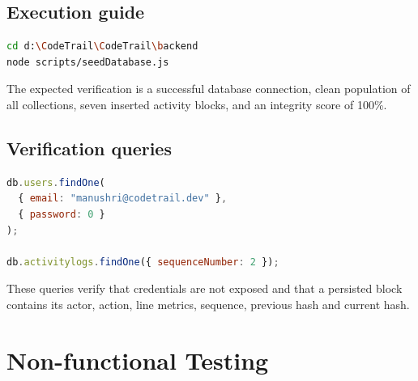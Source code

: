 \documentclass[11pt,a4paper]{article}
\begin{document}
\subsection{Execution guide}
\begin{lstlisting}[language=bash]
cd d:\CodeTrail\CodeTrail\backend
node scripts/seedDatabase.js
\end{lstlisting}
The expected verification is a successful database connection, clean population of
all collections, seven inserted activity blocks, and an integrity score of 100\%.

\subsection{Verification queries}
\begin{lstlisting}[language=JavaScript]
db.users.findOne(
  { email: "manushri@codetrail.dev" },
  { password: 0 }
);

db.activitylogs.findOne({ sequenceNumber: 2 });
\end{lstlisting}
These queries verify that credentials are not exposed and that a persisted block
contains its actor, action, line metrics, sequence, previous hash and current hash.

\section{Non-functional Testing}
\end{document}
